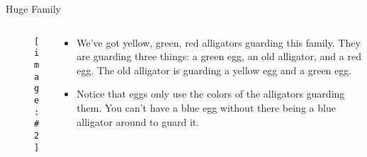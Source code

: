\documentclass[usenames,dvipsnames]{beamer}
\newcommand{\pic}[2]{\texttt{[image: \#2]}}
\begin{document}
\begin{frame}{Huge Family}
  \begin{columns}
    \begin{column}{0.4\textwidth}
      \begin{figure}
        \pic{1}{family/huge.png}
      \end{figure}
    \end{column}
    \begin{column}{0.6\textwidth}
      \begin{itemize}
      \item<1|only@1>
        We've got yellow, green, red alligators guarding this family. They are
        guarding three things: a green egg, an old alligator, and a red egg. The old
        alligator is guarding a yellow egg and a green egg.

      \item<2|only@2>
        Notice that eggs only use the colors of the alligators guarding them. You
        can't have a blue egg without there being a blue alligator around to guard it.
      \end{itemize}
    \end{column}
  \end{columns}
\end{frame}
\end{document}
